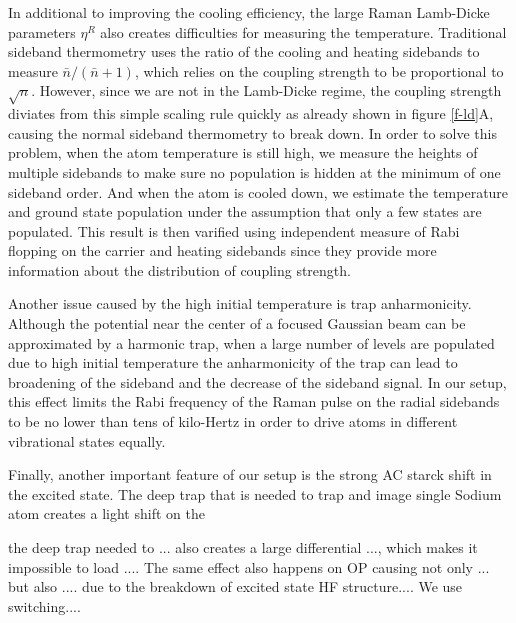 \documentclass[aps,prl,twocolumn,groupedaddress]{revtex4-1}
\begin{document}
In additional to improving the cooling efficiency, the large Raman Lamb-Dicke parameters $\eta^R$
also creates difficulties for measuring the temperature. Traditional sideband thermometry uses
the ratio of the cooling and heating sidebands to measure $\bar n / (\bar n + 1)$, which relies
on the coupling strength to be proportional to $\sqrt{n}$. However, since we are not in the
Lamb-Dicke regime, the coupling strength diviates from this simple scaling rule quickly as already
shown in figure \ref{f-ld}A, causing the normal sideband thermometry to break down.
In order to solve this problem, when the atom temperature is still high,
we measure the heights of multiple sidebands to make sure no population is hidden at the
minimum of one sideband order. And when the atom is cooled down, we estimate the temperature
and ground state population under the assumption that only a few states are populated.
This result is then varified using independent measure of Rabi flopping on the carrier and heating
sidebands since they provide more information about the distribution of coupling strength.

Another issue caused by the high initial temperature is trap anharmonicity.
Although the potential near the center of a focused Gaussian beam can be approximated
by a harmonic trap, when a large number of levels are populated due to high initial temperature
the anharmonicity of the trap can lead to broadening of the sideband and the decrease of
the sideband signal. In our setup, this effect limits the Rabi frequency of the Raman pulse
on the radial sidebands to be no lower than tens of kilo-Hertz in order to drive atoms in
different vibrational states equally.

Finally, another important feature of our setup is the strong AC starck shift in the excited state.
The deep trap that is needed to trap and image single Sodium atom creates a light shift on the

the deep trap needed to ... also creates a large differential ..., which makes it impossible to load .... The same effect also happens on OP causing not only ... but also .... due to the breakdown of excited state HF structure.... We use switching....


\end{document}
